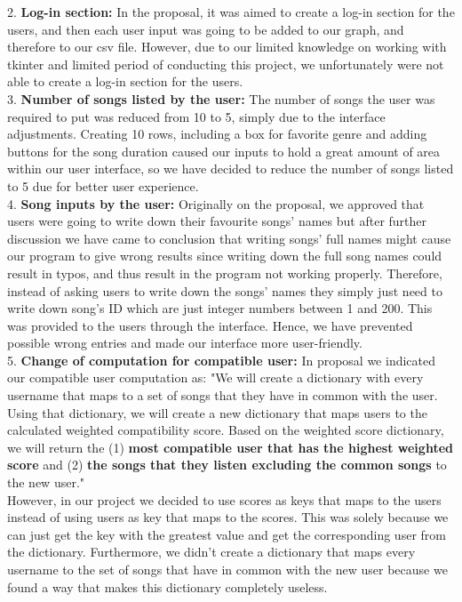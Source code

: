 \documentclass[fontsize=11pt]{article}
\numberwithin{equation}{section}
\theoremstyle{plain} %
\theoremstyle{definition}
\theoremstyle{remark}
\begin{document}
2. \textbf{Log-in section:} In the proposal, it was aimed to create a log-in section for the users, and then each user input was going to be added to our graph, and therefore to our csv file. However, due to our limited knowledge on working with tkinter and limited period of conducting this project, we unfortunately were not able to create a log-in section for the users.  
\\

3. \textbf{Number of songs listed by the user:} The number of songs the user was required to put was reduced from 10 to 5, simply due to the interface adjustments. Creating 10 rows, including a box for favorite genre and adding buttons for the song duration caused our inputs to hold a great amount of area within our user interface, so we have decided to reduce the number of songs listed to 5 due for better user experience.
\\

4. \textbf{Song inputs by the user:} Originally on the proposal, we approved that users were going to write down their favourite songs' names but after further discussion we have came to conclusion that writing songs' full names might cause our program to give wrong results since writing down the full song names could result in typos, and thus result in the program not working properly. Therefore, instead of asking users to write down the songs' names they simply just need to write down song's ID which are just integer numbers between 1 and 200. This was provided to the users through the interface. Hence, we have prevented possible wrong entries and made our interface more user-friendly.
\\

5. \textbf{Change of computation for compatible user:}
In proposal we indicated our compatible user computation as:
"We will create a dictionary with every username that maps to a set of songs that they have in common with the user. Using that dictionary, we will create a new dictionary that maps users to the calculated weighted compatibility score. Based on the weighted score dictionary, we will return the (1) \textbf{most compatible user that has the highest weighted score} and (2)\textbf{ the songs that they listen excluding the common songs} to the new user." \\
However, in our project we decided to use scores as keys that maps to the users instead of using users as key that maps to the scores. This was solely because we can just get the key with the greatest value and get the corresponding user from the dictionary. Furthermore, we didn't create a dictionary that maps every username to the set of songs that have in common with the new user because we found a way that makes this dictionary completely useless.
\end{document}

